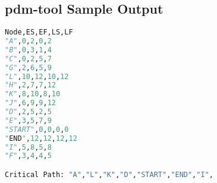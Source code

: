 \begin{appendices}

\chapter{pdm-tool Sample Output}
\label{appendix:sample-output}

\begin{lstlisting}[language=python,frame=single,showstringspaces=false]
Node,ES,EF,LS,LF
"A",0,2,0,2
"B",0,3,1,4
"C",0,2,5,7
"G",2,6,5,9
"L",10,12,10,12
"H",2,7,7,12
"K",8,10,8,10
"J",6,9,9,12
"D",2,5,2,5
"E",3,5,7,9
"START",0,0,0,0
"END",12,12,12,12
"I",5,8,5,8
"F",3,4,4,5

Critical Path: "A","L","K","D","START","END","I",
\end{lstlisting}

\end{appendices}

